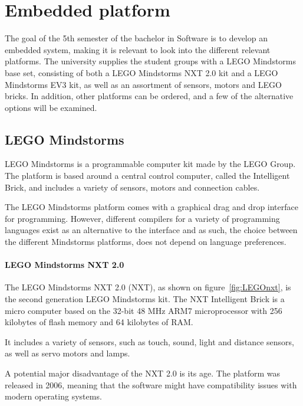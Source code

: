 

\section{Embedded platform}
The goal of the 5th semester of the bachelor in Software is to develop an embedded system, making it is relevant to look into the different relevant platforms.
The university supplies the student groups with a LEGO Mindstorms base set, consisting of both a LEGO Mindstorms NXT 2.0 kit and a LEGO Mindstorms EV3 kit, as well as an assortment of sensors, motors and LEGO bricks.
In addition, other platforms can be ordered, and a few of the alternative options will be examined.

\subsection{LEGO Mindstorms}
LEGO Mindstorms is a programmable computer kit made by the LEGO Group.
The platform is based around a central control computer, called the Intelligent Brick, and includes a variety of sensors, motors and connection cables.

The LEGO Mindstorms platform comes with a graphical drag and drop interface for programming.
However, different compilers for a variety of programming languages exist as an alternative to the interface and as such, the choice between the different Mindstorms platforms, does not depend on language preferences.

\paragraph{LEGO Mindstorms NXT 2.0}
The LEGO Mindstorms NXT 2.0 (NXT), as shown on figure~\autoref{fig:LEGOnxt}, is the second generation LEGO Mindstorms kit.%
The NXT Intelligent Brick is a micro computer based on the 32-bit 48 MHz ARM7 microprocessor with 256 kilobytes of flash memory and 64 kilobytes of RAM\cite{nxt2userguide}\cite{nxt2ev3compare}.

It includes a variety of sensors, such as touch, sound, light and distance sensors, as well as servo motors and lamps.

A potential major disadvantage of the NXT 2.0 is its age.
The platform was released in 2006, meaning that the software might have compatibility issues with modern operating systems.

